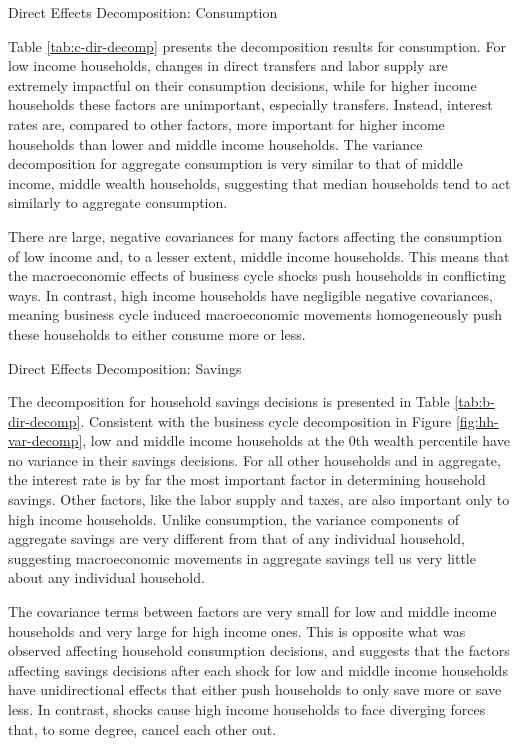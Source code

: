 \begin{table}[t!]  %
    \centering
    \caption{Direct Effects Decomposition: Consumption}
    
    \label{tab:c-dir-decomp}
\end{table}

Table \ref{tab:c-dir-decomp} presents the decomposition results for consumption. For low income households, changes in direct transfers and labor supply are extremely impactful on their consumption decisions, while for higher income households these factors are unimportant, especially transfers. Instead, interest rates are, compared to other factors, more important for higher income households than lower and middle income households. The variance decomposition for aggregate consumption is very similar to that of middle income, middle wealth households, suggesting that median households tend to act similarly to aggregate consumption.

There are large, negative covariances for many factors affecting the consumption of low income and, to a lesser extent, middle income households. This means that the macroeconomic effects of business cycle shocks push households in conflicting ways. In contrast, high income households have negligible negative covariances, meaning business cycle induced macroeconomic movements homogeneously push these households to either consume more or less.

\begin{table}[t!]
    \centering
    \caption{Direct Effects Decomposition: Savings}
    
    \label{tab:b-dir-decomp}
\end{table}

The decomposition for household savings decisions is presented in Table \ref{tab:b-dir-decomp}. Consistent with the business cycle decomposition in Figure \ref{fig:hh-var-decomp}, low and middle income households at the 0th wealth percentile have no variance in their savings decisions. For all other households and in aggregate, the interest rate is by far the most important factor in determining household savings. Other factors, like the labor supply and taxes, are also important only to high income households. Unlike consumption, the variance components of aggregate savings are very different from that of any individual household, suggesting macroeconomic movements in aggregate savings tell us very little about any individual household.

The covariance terms between factors are very small for low and middle income households and very large for high income ones. This is opposite what was observed affecting household consumption decisions, and suggests that the factors affecting savings decisions after each shock for low and middle income households have unidirectional effects that either push households to only save more or save less. In contrast, shocks cause high income households to face diverging forces that, to some degree, cancel each other out.
